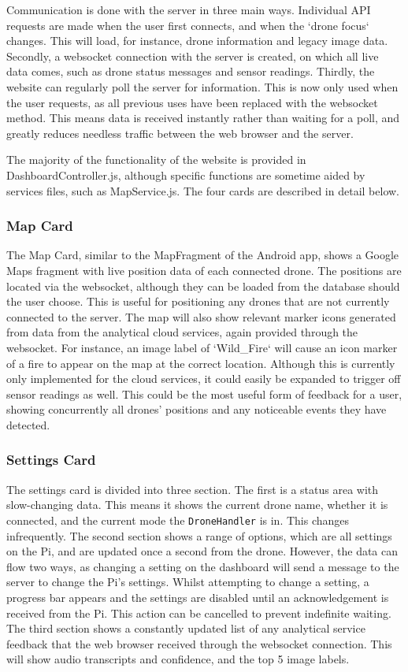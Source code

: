 \documentclass{article}
\begin{document}
Communication is done with the server in three main ways. Individual API requests are made when the user first connects, and when the `drone focus` changes. This will load, for instance, drone information and legacy image data. Secondly, a websocket connection with the server is created, on which all live data comes, such as drone status messages and sensor readings. Thirdly, the website can regularly poll the server for information. This is now only used when the user requests, as all previous uses have been replaced with the websocket method. This means data is received instantly rather than waiting for a poll, and greatly reduces needless traffic between the web browser and the server. 

The majority of the functionality of the website is provided in DashboardController.js, although specific functions are sometime aided by services files, such as MapService.js. The four cards are described in detail below.

\subsubsection{Map Card}
The Map Card, similar to the MapFragment of the Android app, shows a Google Maps fragment with live position data of each connected drone. The positions are located via the websocket, although they can be loaded from the database should the user choose. This is useful for positioning any drones that are not currently connected to the server. The map will also show relevant marker icons generated from data from the analytical cloud services, again provided through the websocket. For instance, an image label of `Wild\_Fire` will cause an icon marker of a fire to appear on the map at the correct location. Although this is currently only implemented for the cloud services, it could easily be expanded to trigger off sensor readings as well. This could be the most useful form of feedback for a user, showing concurrently all drones' positions and any noticeable events they have detected.

\subsubsection{Settings Card}
The settings card is divided into three section. The first is a status area with slow-changing data. This means it shows the current drone name, whether it is connected, and the current mode the \texttt{DroneHandler} is in. This changes infrequently. The second section shows a range of options, which are all settings on the Pi, and are updated once a second from the drone. However, the data can flow two ways, as changing a setting on the dashboard will send a message to the server to change the Pi's settings. Whilst attempting to change a setting, a progress bar appears and the settings are disabled until an acknowledgement is received from the Pi. This action can be cancelled to prevent indefinite waiting. The third section shows a constantly updated list of any analytical service feedback that the web browser received through the websocket connection. This will show audio transcripts and confidence, and the top 5 image labels. 
\end{document}

